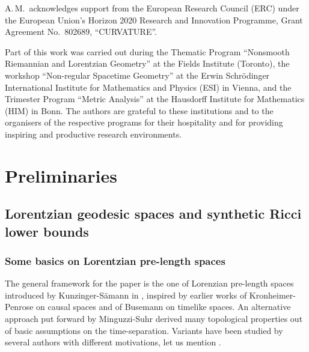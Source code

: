 \documentclass[a4paper,10pt]{article}
\theoremstyle{plain}
\theoremstyle{definition}
\numberwithin{equation}{section}
\begin{document}
A.\,M.\ acknowledges support from the European Research Council (ERC) under the European Union's Horizon 2020 Research and Innovation Programme, Grant Agreement No.\ 802689, ``CURVATURE''.

Part of this work was carried out during the Thematic Program ``Nonsmooth Riemannian and Lorentzian Geometry'' at the Fields Institute (Toronto), the workshop ``Non-regular Spacetime Geometry'' at the Erwin Schr\"odinger International Institute for Mathematics and Physics (ESI) in Vienna, and the Trimester Program ``Metric Analysis'' at the Hausdorff Institute for Mathematics (HIM) in Bonn.  The authors are grateful to these institutions and to the organisers of the respective programs for their hospitality and for providing inspiring and productive research environments.






\section{Preliminaries}\label{S:Preliminaries}





\subsection{Lorentzian geodesic spaces and synthetic Ricci lower bounds}\label{Ss:Ricci-curvature}

\subsubsection{Some basics on Lorentzian pre-length spaces}\label{SS:BasicsLPLS}


The general framework for the paper is the one of Lorenzian pre-length spaces introduced by Kunzinger-S\"amann in \cite{KS}, inspired by earlier works of Kronheimer-Penrose \cite{CausalSpace} on causal spaces and of Busemann \cite{Busemann} on timelike spaces. An alternative approach put forward by Minguzzi-Suhr  \cite{MiSu:LMP24} derived many topological properties out of basic assumptions on the time-separation. Variants have been studied by several authors with different motivations, let us mention \cite{McCann,  BraunMcCann, ByMiSu:LMP25, Octet, MoSa:25, CaMaMo:25}.
\smallskip
\end{document}
